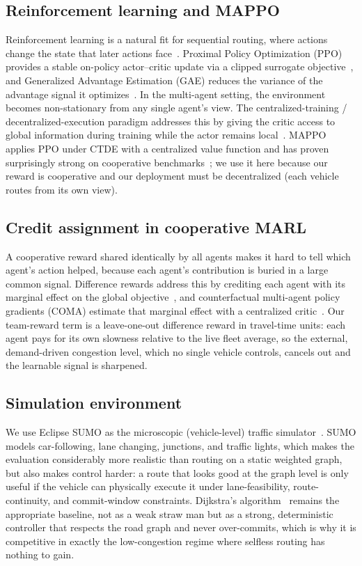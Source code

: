\subsection{Reinforcement learning and MAPPO}
Reinforcement learning is a natural fit for sequential routing, where actions change the
state that later actions face~\citep{mnih2015human}. Proximal Policy Optimization (PPO)
provides a stable on-policy actor--critic update via a clipped surrogate
objective~\citep{schulman2017ppo}, and Generalized Advantage Estimation (GAE) reduces the
variance of the advantage signal it optimizes~\citep{schulman2016gae}. In the multi-agent
setting, the environment becomes non-stationary from any single agent's view. The
centralized-training / decentralized-execution paradigm addresses this by giving the
critic access to global information during training while the actor remains
local~\citep{lowe2017maddpg}. MAPPO applies PPO under CTDE with a centralized value
function and has proven surprisingly strong on cooperative
benchmarks~\citep{yu2022mappo}; we use it here because our reward is cooperative and our
deployment must be decentralized (each vehicle routes from its own view).

\subsection{Credit assignment in cooperative MARL}
A cooperative reward shared identically by all agents makes it hard to tell which agent's
action helped, because each agent's contribution is buried in a large common signal.
Difference rewards address this by crediting each agent with its marginal effect on the
global objective~\citep{wolpert2001collectives}, and counterfactual multi-agent policy
gradients (COMA) estimate that marginal effect with a centralized
critic~\citep{foerster2018coma}. Our team-reward term is a leave-one-out difference reward
in travel-time units: each agent pays for its own slowness relative to the live fleet
average, so the external, demand-driven congestion level, which no single vehicle
controls, cancels out and the learnable signal is sharpened.

\subsection{Simulation environment}
We use Eclipse SUMO as the microscopic (vehicle-level) traffic simulator~\citep{lopez2018sumo,krajzewicz2012recent}.
SUMO models car-following, lane changing, junctions, and traffic lights, which makes the
evaluation considerably more realistic than routing on a static weighted graph, but also
makes control harder: a route that looks good at the graph level is only useful if the
vehicle can physically execute it under lane-feasibility, route-continuity, and
commit-window constraints. Dijkstra's algorithm~\citep{dijkstra1959note} remains the
appropriate baseline, not as a weak straw man but as a strong, deterministic controller
that respects the road graph and never over-commits, which is why it is competitive in
exactly the low-congestion regime where selfless routing has nothing to gain.

